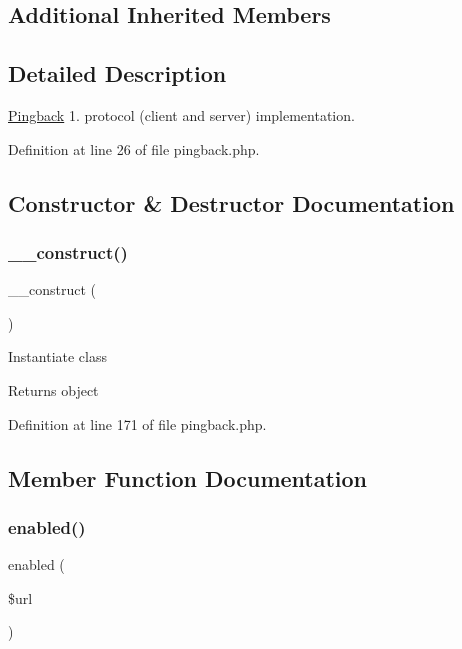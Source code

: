 \subsection*{Additional Inherited Members}


\subsection{Detailed Description}
\hyperlink{class_web_1_1_pingback}{Pingback} 1. protocol (client and server) implementation. 

Definition at line 26 of file pingback.\+php.



\subsection{Constructor \& Destructor Documentation}
\hypertarget{class_web_1_1_pingback_a095c5d389db211932136b53f25f39685}{}\label{class_web_1_1_pingback_a095c5d389db211932136b53f25f39685} 
\subsubsection{\texorpdfstring{\+\_\+\+\_\+construct()}{\_\_construct()}}
{\footnotesize\ttfamily \+\_\+\+\_\+construct (\begin{DoxyParamCaption}{ }\end{DoxyParamCaption})}

Instantiate class \begin{DoxyReturn}{Returns}
object 
\end{DoxyReturn}


Definition at line 171 of file pingback.\+php.



\subsection{Member Function Documentation}
\hypertarget{class_web_1_1_pingback_a40d5adaa4e43f4c875ad081d7118ce4e}{}\label{class_web_1_1_pingback_a40d5adaa4e43f4c875ad081d7118ce4e} 
\subsubsection{\texorpdfstring{enabled()}{enabled()}}
{\footnotesize\ttfamily enabled (\begin{DoxyParamCaption}\item[{}]{\$url }\end{DoxyParamCaption})\hspace{0.3cm}{\ttfamily [protected]}}

